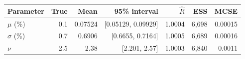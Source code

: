 \begin{tabular}{@{}lrrrrrr@{}}
\toprule
Parameter & True & Mean & 95\% interval & $\hat R$ & ESS & MCSE \\
\midrule
$\mu$ (\%) & 0.1 & 0.07524 & [0.05129, 0.09929] & 1.0004 & 6,698 & 0.00015 \\
$\sigma$ (\%) & 0.7 & 0.6906 & [0.6655, 0.7164] & 1.0005 & 6,689 & 0.00016 \\
$\nu$ & 2.5 & 2.38 & [2.201, 2.57] & 1.0003 & 6,840 & 0.0011 \\
\bottomrule
\end{tabular}

